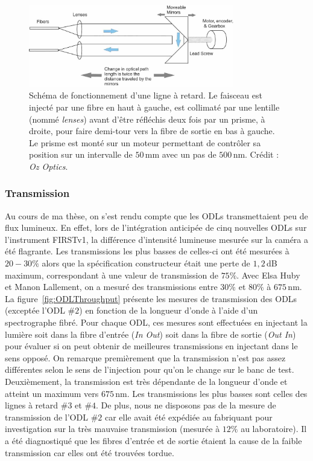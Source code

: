 \begin{figure}[ht!]
    \centering
    \includegraphics[width=0.8\textwidth]{Figure_Chap2/ODL_Scheme.png}
    \caption[Schéma de fonctionnement d'une ligne à retard.]{Schéma de fonctionnement d'une ligne à retard. Le faisceau est injecté par une fibre en haut à gauche, est collimaté par une lentille (nommé \textit{lenses}) avant d'être réfléchis deux fois par un prisme, à droite, pour faire demi-tour vers la fibre de sortie en bas à gauche. Le prisme est monté sur un moteur permettant de contrôler sa position sur un intervalle de $50\,$mm avec un pas de $500 \,$nm. Crédit : \textit{Oz Optics}.}
    \label{fig:ODLScheme}
\end{figure}


\subsubsection{Transmission}

Au cours de ma thèse, on s'est rendu compte que les \ac{ODL}s transmettaient peu de flux lumineux. En effet, lors de l'intégration anticipée de cinq nouvelles \ac{ODL}s sur l'instrument \ac{FIRSTv1}, la différence d'intensité lumineuse mesurée sur la caméra a été flagrante. Les transmissions les plus basses de celles-ci ont été mesurées à $20 - 30 \%$ alors que la spécification constructeur était une perte de $1,2\,$dB maximum, correspondant à une valeur de transmission de $75\%$. Avec Elsa Huby et Manon Lallement, on a mesuré des transmissions entre $30\%$ et $80\%$ à $675 \,$nm. La figure~\ref{fig:ODLThroughput} présente les mesures de transmission des \ac{ODL}s (exceptée l'\ac{ODL} $\#2$) en fonction de la longueur d'onde à l'aide d'un spectrographe fibré. Pour chaque \ac{ODL}, ces mesures sont effectuées en injectant la lumière soit dans la fibre d'entrée (\textit{In Out}) soit dans la fibre de sortie (\textit{Out In}) pour évaluer si on peut obtenir de meilleures transmissions en injectant dans le sens opposé. On remarque premièrement que la transmission n'est pas assez différentes selon le sens de l'injection pour qu'on le change sur le banc de test. Deuxièmement, la transmission est très dépendante de la longueur d'onde et atteint un maximum vers $675 \,$nm. Les transmissions les plus basses sont celles des lignes à retard $\#3$ et $\#4$. De plus, nous ne disposons pas de la mesure de transmission de l'\ac{ODL} $\#2$ car elle avait été expédiée au fabriquant pour investigation sur la très mauvaise transmission (mesurée à $12\%$ au laboratoire). Il a été diagnostiqué que les fibres d'entrée et de sortie étaient la cause de la faible transmission car elles ont été trouvées tordue.

